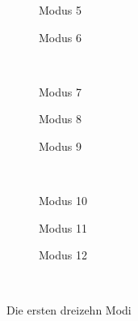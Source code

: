 \documentclass[]{report}
\begin{document}
\begin{enumerate}
\begin{enumerate}
\begin{figure}[tbp!]
\begin{subfigure}{0.3\textwidth}
				\centering
				
				\caption{Modus 5}
				\label{fig:mode5}
			\end{subfigure}	
			\quad
			\begin{subfigure}{0.3\textwidth}
				\centering
				
				\caption{Modus 6}
				\label{fig:mode6}
			\end{subfigure}	
			\\
			\begin{subfigure}{0.3\textwidth}
				\centering
				
				\caption{Modus 7}
				\label{fig:mode7}
			\end{subfigure}
			\quad
			\begin{subfigure}{0.3\textwidth}
				\centering
				
				\caption{Modus 8}
				\label{fig:mode8}
			\end{subfigure}	
			\quad
			\begin{subfigure}{0.3\textwidth}
				\centering
				
				\caption{Modus 9}
				\label{fig:mode9}
			\end{subfigure}	
			\\
			\begin{subfigure}{0.3\textwidth}
				\centering
				
				\caption{Modus 10}
				\label{fig:mode10}
			\end{subfigure}
			\quad
			\begin{subfigure}{0.3\textwidth}
				\centering
				
				\caption{Modus 11}
				\label{fig:mode11}
			\end{subfigure}	
			\quad
			\begin{subfigure}{0.3\textwidth}
				\centering
				
				\caption{Modus 12}
				\label{fig:mode12}
			\end{subfigure}	
			\\
			\caption{Die ersten dreizehn Modi}
			\label{fig:modi}
		\end{figure}
		

\end{enumerate}
\end{enumerate}
\end{document}
